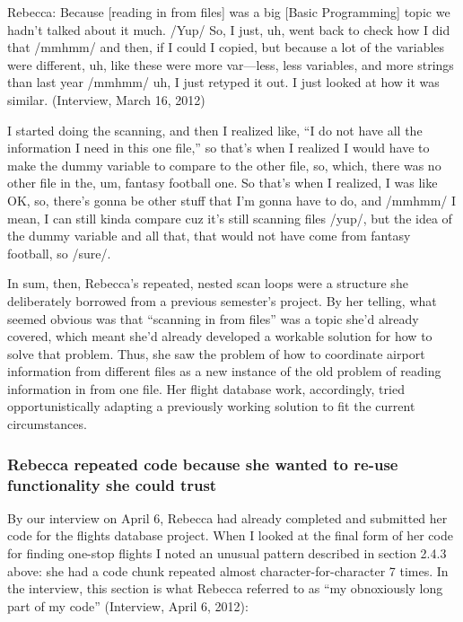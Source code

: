 Rebecca: Because {[}reading in from files{]} was a big {[}Basic
Programming{]} topic we hadn't talked about it much. /Yup/ So, I just,
uh, went back to check how I did that /mmhmm/ and then, if I could I
copied, but because a lot of the variables were different, uh, like
these were more var---less, less variables, and more strings than last
year /mmhmm/ uh, I just retyped it out. I just looked at how it was
similar. (Interview, March 16, 2012)

I started doing the scanning, and then I realized like, ``I do not have
all the information I need in this one file,'' so that's when I realized
I would have to make the dummy variable to compare to the other file,
so, which, there was no other file in the, um, fantasy football one. So
that's when I realized, I was like OK, so, there's gonna be other stuff
that I'm gonna have to do, and /mmhmm/ I mean, I can still kinda compare
cuz it's still scanning files /yup/, but the idea of the dummy variable
and all that, that would not have come from fantasy football, so /sure/.

In sum, then, Rebecca's repeated, nested scan loops were a structure she
deliberately borrowed from a previous semester's project. By her
telling, what seemed obvious was that ``scanning in from files'' was a
topic she'd already covered, which meant she'd already developed a
workable solution for how to solve that problem. Thus, she saw the
problem of how to coordinate airport information from different files as
a new instance of the old problem of reading information in from one
file. Her flight database work, accordingly, tried opportunistically
adapting a previously working solution to fit the current circumstances.

\subsubsection{Rebecca repeated code because she wanted to re-use
functionality she could
trust}\label{rebecca-repeated-code-because-she-wanted-to-re-use-functionality-she-could-trust}

By our interview on April 6, Rebecca had already completed and submitted
her code for the flights database project. When I looked at the final
form of her code for finding one-stop flights I noted an unusual pattern
described in section 2.4.3 above: she had a code chunk repeated almost
character-for-character 7 times. In the interview, this section is what
Rebecca referred to as ``my obnoxiously long part of my code''
(Interview, April 6, 2012):

